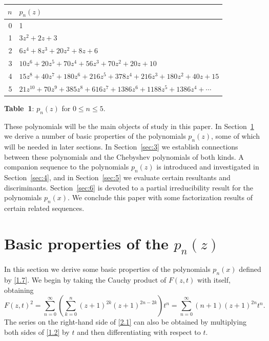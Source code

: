 \documentclass{amsart}
\theoremstyle{plain}
\numberwithin{equation}{section}
\begin{document}
\medskip
\begin{center}
{\renewcommand{\arraystretch}{1.1}
\begin{tabular}{|r|l|}
\hline
$n$ & $p_n(z)$ \\
\hline
0 & 1 \\
1 & $3z^2+2z+3$ \\
2 & $6z^4+8z^3 + 20z^2 + 8z + 6$ \\
3 & $10z^6 + 20z^5 + 70z^4 + 56z^3 + 70z^2 + 20z + 10$  \\
4 & $15z^8 + 40z^7 + 180z^6 + 216z^5 + 378z^4 + 216z^3 + 180z^2 + 40z + 15$  \\
5 & $21 z^{10}+70 z^9+385 z^8+616 z^7+1386 z^6+1188 z^5+1386 z^4+\cdots$  \\
\hline
\end{tabular}}

\medskip
{\bf Table~1}: $p_n(z)$ for $0\leq n\leq 5$.
\end{center}

\medskip
These polynomials will be the main objects of study in this paper.
In Section~\ref{sec:2} we derive a number of basic properties of the polynomials
$p_n(z)$, some of which will be needed in later sections. In Section~\ref{sec:3}
we establish connections between these polynomials and the Chebyshev
polynomials of both kinds. A companion sequence to the polynomials $p_n(z)$ is
introduced and investigated in Section~\ref{sec:4}, and in Section~\ref{sec:5}
we evaluate certain resultants and discriminants. Section~\ref{sec:6} is 
devoted to a partial irreducibility result for the polynomials $p_n(x)$.
We conclude this paper with some factorization results of certain related
sequences.


\section{Basic properties of the $p_n(z)$}\label{sec:2}

In this section we derive some basic properties of the polynomials $p_n(x)$
defined by \eqref{1.7}. We begin by taking the Cauchy product of $F(z,t)$
with itself, obtaining
\begin{equation}\label{2.1}
F(z,t)^2=\sum_{n=0}^\infty\left(\sum_{k=0}^n(z+1)^{2k}(z+1)^{2n-2k}\right)t^n
=\sum_{n=0}^\infty(n+1)(z+1)^{2n}t^n.
\end{equation}
The series on the right-hand side of \eqref{2.1} can also be obtained by 
multiplying both sides of \eqref{1.2} by $t$ and then differentiating with
respect to $t$.
\end{document}
